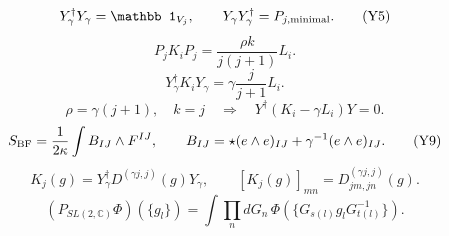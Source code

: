 \documentclass{article}
\begin{document}
\begin{equation}
Y_\gamma^\dagger Y_\gamma=\mathbb1_{V_j},\qquad Y_\gamma Y_\gamma^\dagger=P_{j,{\rm minimal}}.
\tag{Y5}
\end{equation}
\begin{equation}
P_jK_iP_j=\frac{\rho k}{j(j+1)}L_i.
\tag{Y6}
\end{equation}
\begin{equation}
Y_\gamma^\dagger K_iY_\gamma=\gamma\frac{j}{j+1}L_i.
\tag{Y7}
\end{equation}
\begin{equation}
\rho=\gamma(j+1),\quad k=j\quad\Longrightarrow\quad Y^\dagger(K_i-\gamma L_i)Y=0.
\tag{Y8}
\end{equation}
\begin{equation}
S_{\rm BF}=\frac1{2\kappa}\int B_{IJ}\wedge F^{IJ},\qquad B_{IJ}=\star(e\wedge e)_{IJ}+\gamma^{-1}(e\wedge e)_{IJ}.
\tag{Y9}
\end{equation}
\begin{equation}
K_j(g)=Y_\gamma^\dagger D^{(\gamma j,j)}(g)Y_\gamma,\qquad[K_j(g)]_{mn}=D^{(\gamma j,j)}_{jm,jn}(g).
\tag{D1}
\end{equation}
\begin{equation}
(P_{SL(2,\mathbb C)}\Phi)(\{g_l\})=\int\prod_n dG_n\,\Phi(\{G_{s(l)}g_lG_{t(l)}^{-1}\}).
\tag{D2}
\end{equation}
\end{document}
